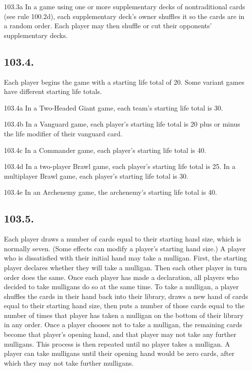 103.3a In a game using one or more supplementary decks of nontraditional cards (see rule 100.2d), each supplementary deck’s owner shuffles it so the cards are in a random order. Each player may then shuffle or cut their opponents’ supplementary decks.

\subsection*{103.4.}
Each player begins the game with a starting life total of 20. Some variant games have different starting life totals.

103.4a In a Two-Headed Giant game, each team’s starting life total is 30.

103.4b In a Vanguard game, each player’s starting life total is 20 plus or minus the life modifier of their vanguard card.

103.4c In a Commander game, each player’s starting life total is 40.

103.4d In a two-player Brawl game, each player’s starting life total is 25. In a multiplayer Brawl game, each player’s starting life total is 30.

103.4e In an Archenemy game, the archenemy’s starting life total is 40.

\subsection*{103.5.}
Each player draws a number of cards equal to their starting hand size, which is normally seven. (Some effects can modify a player’s starting hand size.) A player who is dissatisfied with their initial hand may take a mulligan. First, the starting player declares whether they will take a mulligan. Then each other player in turn order does the same. Once each player has made a declaration, all players who decided to take mulligans do so at the same time. To take a mulligan, a player shuffles the cards in their hand back into their library, draws a new hand of cards equal to their starting hand size, then puts a number of those cards equal to the number of times that player has taken a mulligan on the bottom of their library in any order. Once a player chooses not to take a mulligan, the remaining cards become that player’s opening hand, and that player may not take any further mulligans. This process is then repeated until no player takes a mulligan. A player can take mulligans until their opening hand would be zero cards, after which they may not take further mulligans.

